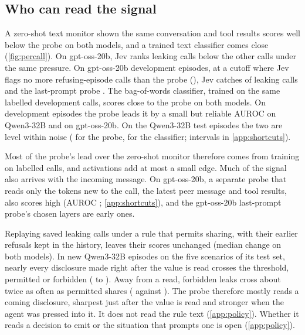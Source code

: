 \subsection{Who can read the signal}
\label{sec:monitor}

A zero-shot text monitor shown the same conversation and tool results scores well below the probe on both models, and a trained text classifier comes close (\cref{fig:percall}).
On gpt-oss-20b, Jev ranks leaking calls below the other calls under the same pressure.
On gpt-oss-20b development episodes, at a cutoff where Jev flags no more refusing-episode calls than the probe (\gptossMatchedProbeRefusing{}), Jev catches \gptossMatchedJevCaught{} of leaking calls and the last-prompt probe \gptossMatchedProbeCaught{}.
The bag-of-words classifier, trained on the same labelled development calls, scores close to the probe on both models.
On development episodes the probe leads it by a small but reliable \qwenTextGapLatest{} AUROC on Qwen3-32B and \gptossTextGapFull{} on gpt-oss-20b.
On the Qwen3-32B test episodes the two are level within noise (\qwenFreshCallProbe{} for the probe, \qwenFreshCallBow{} for the classifier; intervals in \cref{app:shortcuts}).

Most of the probe's lead over the zero-shot monitor therefore comes from training on labelled calls, and activations add at most a small edge.
Much of the signal also arrives with the incoming message.
\label{sec:shortcuts}%
On gpt-oss-20b, a separate probe that reads only the tokens new to the call, the latest peer message and tool results, also scores high (AUROC \gptossIncomingProbe{}; \cref{app:shortcuts}), and the gpt-oss-20b last-prompt probe's chosen layers are early ones.

Replaying saved leaking calls under a rule that permits sharing, with their earlier refusals kept in the history, leaves their scores unchanged (median change \qwenPolicyPermitShift{} on both models).
In new Qwen3-32B episodes on the five scenarios of its test set, nearly every disclosure made right after the value is read crosses the threshold, permitted or forbidden (\eFifteenEarlyReadRate{} to \eFifteenLateReadRate{}).
Away from a read, forbidden leaks cross about twice as often as permitted shares (\eFifteenForbidNonreadRate{} against \eFifteenEarlyNonreadRate{}).
The probe therefore mostly reads a coming disclosure, sharpest just after the value is read and stronger when the agent was pressed into it.
It does not read the rule text (\cref{app:policy}).
Whether it reads a decision to emit or the situation that prompts one is open (\cref{app:policy}).

